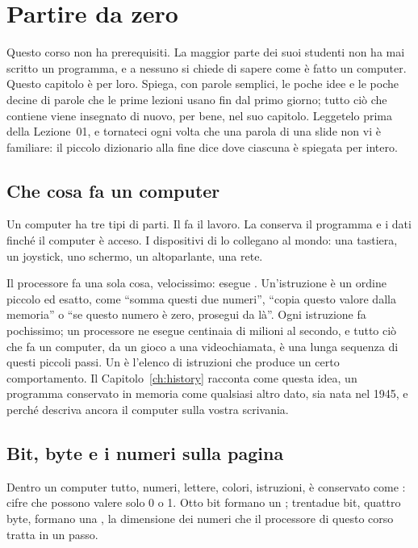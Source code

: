 \chapter{Partire da zero}
\label{ch:zero}

Questo corso non ha prerequisiti. La maggior parte dei suoi studenti non ha mai
scritto un programma, e a nessuno si chiede di sapere come è fatto un computer.
Questo capitolo è per loro. Spiega, con parole semplici, le poche idee e le
poche decine di parole che le prime lezioni usano fin dal primo giorno; tutto
ciò che contiene viene insegnato di nuovo, per bene, nel suo capitolo. Leggetelo
prima della Lezione~01, e tornateci ogni volta che una parola di una slide non
vi è familiare: il piccolo dizionario alla fine dice dove ciascuna è spiegata
per intero.

\section*{Che cosa fa un computer}

Un computer ha tre tipi di parti. Il  fa il lavoro. La
 conserva il programma e i dati finché il computer è acceso. I
dispositivi di  lo collegano al mondo: una tastiera, un
joystick, uno schermo, un altoparlante, una rete.

Il processore fa una sola cosa, velocissimo: esegue .
Un'istruzione è un ordine piccolo ed esatto, come ``somma questi due numeri'',
``copia questo valore dalla memoria'' o ``se questo numero è zero, prosegui da
là''. Ogni istruzione fa pochissimo; un processore ne esegue centinaia di
milioni al secondo, e tutto ciò che fa un computer, da un gioco a una
videochiamata, è una lunga sequenza di questi piccoli passi. Un
 è l'elenco di istruzioni che produce un certo comportamento.
Il Capitolo~\ref{ch:history} racconta come questa idea, un programma conservato
in memoria come qualsiasi altro dato, sia nata nel 1945, e perché descriva
ancora il computer sulla vostra scrivania.

\section*{Bit, byte e i numeri sulla pagina}

Dentro un computer tutto, numeri, lettere, colori, istruzioni, è conservato
come : cifre che possono valere solo 0 o 1. Otto bit formano un
; trentadue bit, quattro byte, formano una , la
dimensione dei numeri che il processore di questo corso tratta in un passo.

